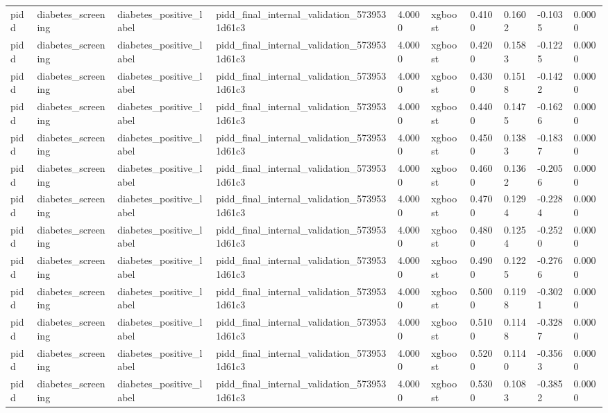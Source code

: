 \begin{tabular}{llllllllll}
pidd & diabetes\_screening & diabetes\_positive\_label & pidd\_final\_internal\_validation\_5739531d61c3 & 4.0000 & xgboost & 0.4100 & 0.1602 & -0.1035 & 0.0000 \\
pidd & diabetes\_screening & diabetes\_positive\_label & pidd\_final\_internal\_validation\_5739531d61c3 & 4.0000 & xgboost & 0.4200 & 0.1583 & -0.1225 & 0.0000 \\
pidd & diabetes\_screening & diabetes\_positive\_label & pidd\_final\_internal\_validation\_5739531d61c3 & 4.0000 & xgboost & 0.4300 & 0.1518 & -0.1422 & 0.0000 \\
pidd & diabetes\_screening & diabetes\_positive\_label & pidd\_final\_internal\_validation\_5739531d61c3 & 4.0000 & xgboost & 0.4400 & 0.1475 & -0.1626 & 0.0000 \\
pidd & diabetes\_screening & diabetes\_positive\_label & pidd\_final\_internal\_validation\_5739531d61c3 & 4.0000 & xgboost & 0.4500 & 0.1383 & -0.1837 & 0.0000 \\
pidd & diabetes\_screening & diabetes\_positive\_label & pidd\_final\_internal\_validation\_5739531d61c3 & 4.0000 & xgboost & 0.4600 & 0.1362 & -0.2056 & 0.0000 \\
pidd & diabetes\_screening & diabetes\_positive\_label & pidd\_final\_internal\_validation\_5739531d61c3 & 4.0000 & xgboost & 0.4700 & 0.1294 & -0.2284 & 0.0000 \\
pidd & diabetes\_screening & diabetes\_positive\_label & pidd\_final\_internal\_validation\_5739531d61c3 & 4.0000 & xgboost & 0.4800 & 0.1254 & -0.2520 & 0.0000 \\
pidd & diabetes\_screening & diabetes\_positive\_label & pidd\_final\_internal\_validation\_5739531d61c3 & 4.0000 & xgboost & 0.4900 & 0.1225 & -0.2766 & 0.0000 \\
pidd & diabetes\_screening & diabetes\_positive\_label & pidd\_final\_internal\_validation\_5739531d61c3 & 4.0000 & xgboost & 0.5000 & 0.1198 & -0.3021 & 0.0000 \\
pidd & diabetes\_screening & diabetes\_positive\_label & pidd\_final\_internal\_validation\_5739531d61c3 & 4.0000 & xgboost & 0.5100 & 0.1148 & -0.3287 & 0.0000 \\
pidd & diabetes\_screening & diabetes\_positive\_label & pidd\_final\_internal\_validation\_5739531d61c3 & 4.0000 & xgboost & 0.5200 & 0.1140 & -0.3563 & 0.0000 \\
pidd & diabetes\_screening & diabetes\_positive\_label & pidd\_final\_internal\_validation\_5739531d61c3 & 4.0000 & xgboost & 0.5300 & 0.1083 & -0.3852 & 0.0000 \\

\end{tabular}
